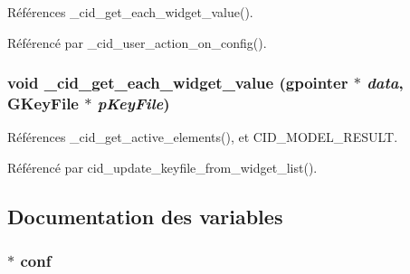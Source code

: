 Références \_\-cid\_\-get\_\-each\_\-widget\_\-value().

Référencé par \_\-cid\_\-user\_\-action\_\-on\_\-config().
\subsubsection{\setlength{\rightskip}{0pt plus 5cm}void \_\-cid\_\-get\_\-each\_\-widget\_\-value (gpointer $\ast$ {\em data}, \/  GKeyFile $\ast$ {\em pKeyFile})}\label{cid-config_8c_ab4246cffd42c2d1e7548e1f52d69082}




Références \_\-cid\_\-get\_\-active\_\-elements(), et CID\_\-MODEL\_\-RESULT.

Référencé par cid\_\-update\_\-keyfile\_\-from\_\-widget\_\-list().

\subsection{Documentation des variables}
\subsubsection{$\ast$ {\bf conf}}\label{cid-config_8c_15199c9647fdc5129281614002d6af25}


